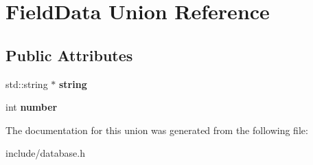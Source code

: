 \hypertarget{union_field_data}{}\section{Field\+Data Union Reference}
\label{union_field_data}
\subsection*{Public Attributes}
\begin{DoxyCompactItemize}
\item 
\mbox{\label{union_field_data_ad205f8a77e6b272bfbe3305fccc9d824}} 
std\+::string $\ast$ {\bfseries string}
\item 
\mbox{\label{union_field_data_a1c6ad521dfa06d4fab63fb33c0277bb5}} 
int {\bfseries number}
\end{DoxyCompactItemize}


The documentation for this union was generated from the following file\+:\begin{DoxyCompactItemize}
\item 
include/database.\+h\end{DoxyCompactItemize}
